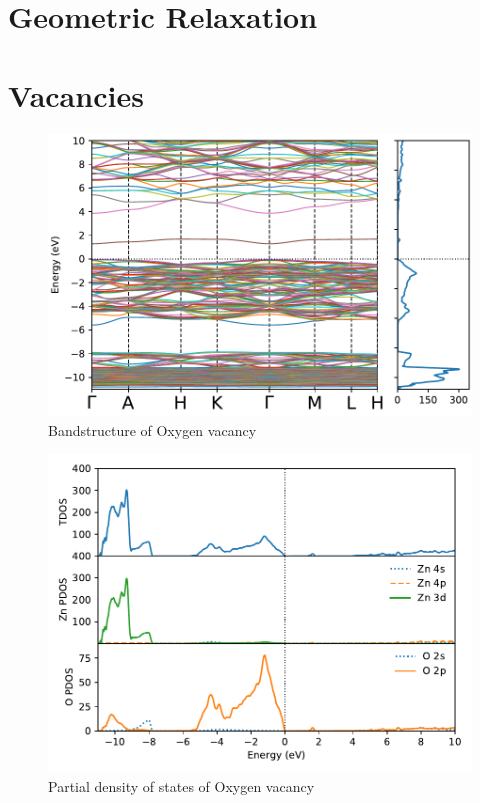 \section{Geometric Relaxation}

\clearpage

\section{Vacancies}

\begin{figure}[tbh!]
	\centering
	\includegraphics[width=0.7\linewidth]{"images/rnd/band-dos_O_vac"}
	\caption[Bandstructure of Oxygen vacancy]{Bandstructure of Oxygen vacancy}
\end{figure}

\begin{figure}[tbh!]
	\centering
	\includegraphics[width=0.7\linewidth]{"images/rnd/dos-pdos_O_vac"}
	\caption[Partial density of states of Oxygen vacancy]{Partial density of states of Oxygen vacancy}
\end{figure}


